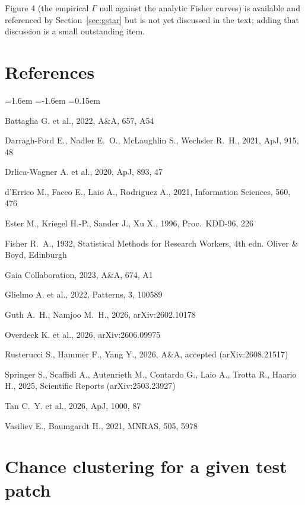 \documentclass[11pt,a4paper]{article}
\newcommand{\Ups}{\Upsilon}                  %
\newcommand{\Gam}{\Gamma}                    %
\newcommand{\Ups}{\Upsilon}
\newcommand{\Gam}{\Gamma}
\begin{document}
Figure 4 (the empirical $\Gam$ null against the analytic Fisher curves) is available and referenced
by Section~\ref{sec:gstar} but is not yet discussed in the text; adding that discussion is a small
outstanding item.

\section*{References}

\begin{list}{}{\leftmargin=1.6em \itemindent=-1.6em \itemsep=0.15em \parsep=0pt}
\item Battaglia G. et al., 2022, A\&A, 657, A54
\item Darragh-Ford E., Nadler E.~O., McLaughlin S., Wechsler R.~H., 2021, ApJ, 915, 48
\item Drlica-Wagner A. et al., 2020, ApJ, 893, 47
\item d'Errico M., Facco E., Laio A., Rodriguez A., 2021, Information Sciences, 560, 476
\item Ester M., Kriegel H.-P., Sander J., Xu X., 1996, Proc.\ KDD-96, 226
\item Fisher R.~A., 1932, Statistical Methods for Research Workers, 4th edn. Oliver \& Boyd,
      Edinburgh
\item Gaia Collaboration, 2023, A\&A, 674, A1
\item Glielmo A. et al., 2022, Patterns, 3, 100589
\item Guth A.~H., Namjoo M.~H., 2026, arXiv:2602.10178
\item Overdeck K. et al., 2026, arXiv:2606.09975
\item Rusterucci S., Hammer F., Yang Y., 2026, A\&A, accepted (arXiv:2608.21517)
\item Springer S., Scaffidi A., Autenrieth M., Contardo G., Laio A., Trotta R., Haario H., 2025,
      Scientific Reports (arXiv:2503.23927)
\item Tan C.~Y. et al., 2026, ApJ, 1000, 87
\item Vasiliev E., Baumgardt H., 2021, MNRAS, 505, 5978
\end{list}


\section{Chance clustering for a given test patch}
\end{document}
